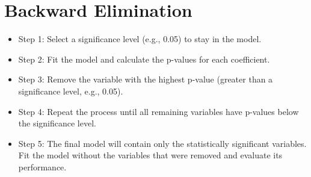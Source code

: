 \documentclass[conference]{IEEEtran}
\begin{document}
\section*{Backward Elimination}
\begin{itemize}
    \item Step 1: Select a significance level (e.g., 0.05) to stay in the model.
    \item Step 2: Fit the model and calculate the p-values for each coefficient.
    \item Step 3: Remove the variable with the highest p-value (greater than a significance level, e.g., 0.05).
    \item Step 4: Repeat the process until all remaining variables have p-values below the significance level.
    \item Step 5: The final model will contain only the statistically significant variables. Fit the model without the variables that were removed and evaluate its performance.
\end{itemize}
\end{document}
